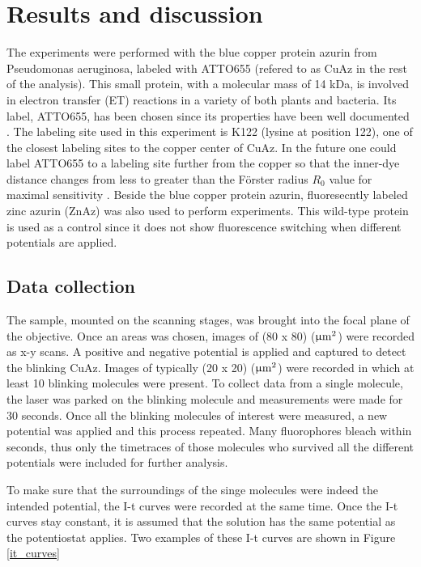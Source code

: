 \documentclass[twoside,single]{lion-msc}
\begin{document}
\chapter{Results and discussion}

The experiments were performed with the blue copper protein azurin from Pseudomonas aeruginosa, labeled with ATTO655 (refered to as CuAz in the rest of the analysis). This small protein, with a molecular mass of 14 kDa, is involved in electron transfer (ET) reactions in a variety of both plants and bacteria. Its label, ATTO655, has been chosen since its properties have been well documented \cite{pvd_11}. The labeling site used in this experiment is K122 (lysine at position 122), one of the closest labeling sites to the copper center of CuAz. In the future one could label ATTO655 to a labeling site further from the copper so that the inner-dye distance changes from less to greater than the F\"{o}rster radius $R_{0}$ value for maximal sensitivity \cite{Roy2008}. 
Beside the blue copper protein azurin, fluoresecntly labeled zinc azurin (ZnAz) was also used to perform experiments. This wild-type protein is used as a control since it does not show fluorescence switching when different potentials are applied.

\section*{Data collection} \label{data_coll}
The sample, mounted on the scanning stages, was brought into the focal plane of the objective. Once an areas was chosen, images of (80 x 80) ($\upmu \textup{m}^{2}$) were recorded as x-y scans. A positive and negative potential is applied and captured to detect the blinking CuAz. Images of typically (20 x 20) ($\upmu \textup{m}^{2}$) were recorded in which at least 10 blinking molecules were present. To collect data from a single molecule, the laser was parked on the blinking molecule and measurements were made for 30 seconds. Once all the blinking molecules of interest were measured, a new potential was applied and this process repeated. Many fluorophores bleach within seconds, thus only the timetraces of those molecules who survived all the different potentials were included for further analysis. 

To make sure that the surroundings of the singe molecules were indeed the intended potential, the I-t curves were recorded at the same time. Once the I-t curves stay constant, it is assumed that the solution has the same potential as the potentiostat applies. Two examples of these I-t curves are shown in Figure \ref{it_curves}
\end{document}
